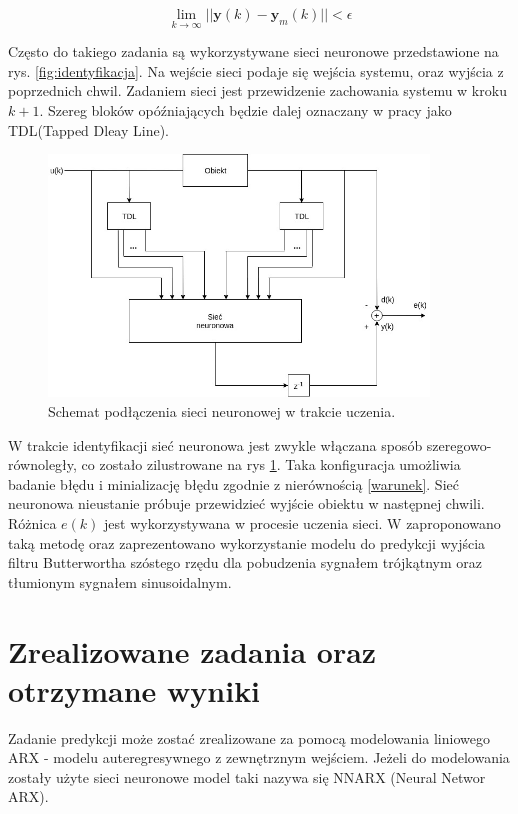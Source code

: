 \documentclass{article}
\newcommand{\bb}{\textbf}
\begin{document}
\begin{equation}
	\displaystyle{\lim_{k \to \infty}} ||\bb{y}(k)-\bb{y}_m(k)|| < \epsilon
\end{equation}

Często do takiego zadania są wykorzystywane sieci neuronowe przedstawione na rys. \ref{fig:identyfikacja}. Na wejście sieci podaje się wejścia systemu, oraz wyjścia z poprzednich chwil. Zadaniem sieci jest przewidzenie zachowania systemu w kroku $k+1$. Szereg bloków opóźniających będzie dalej oznaczany w pracy jako TDL(Tapped Dleay Line).

\begin{figure}
\centering
	\includegraphics[width=0.90\textwidth]{ident2.jpg}\par\vspace{1cm}
\caption{Schemat podłączenia sieci neuronowej w trakcie uczenia.}
	\label{fig:identyfikacja2}
\end{figure}

W trakcie identyfikacji sieć neuronowa jest zwykle włączana sposób szeregowo-równoległy, co zostało zilustrowane na rys \ref{fig:identyfikacja2}. Taka konfiguracja umożliwia badanie błędu i minializację błędu zgodnie z nierównością \ref{warunek}. Sieć neuronowa nieustanie próbuje przewidzieć wyjście obiektu w następnej chwili. Różnica $e(k)$ jest wykorzystywana w procesie uczenia sieci. W \cite{Osowski} zaproponowano taką metodę oraz zaprezentowano wykorzystanie modelu do predykcji wyjścia filtru Butterwortha szóstego rzędu dla pobudzenia sygnałem trójkątnym oraz tłumionym sygnałem sinusoidalnym.

\section{Zrealizowane zadania oraz otrzymane wyniki}
Zadanie predykcji może zostać zrealizowane za pomocą modelowania liniowego ARX -
modelu auteregresywnego z zewnętrznym wejściem. Jeżeli do modelowania zostały
użyte sieci neuronowe model taki nazywa się NNARX (Neural Networ ARX).
\end{document}
